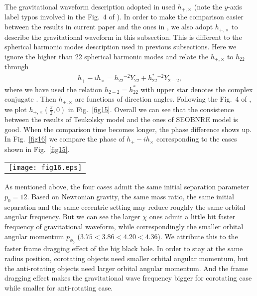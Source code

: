 \documentclass[prd,aps,a4paper,superscriptaddress,twocolumn,footinbib,showpacs]{revtex4}
\begin{document}
The gravitational waveform description adopted in \cite{han2014gravitational} used $h_{+,\times}$ (note the $y$-axis label typos involved in the Fig.~4 of \cite{han2014gravitational}). In order to make the comparison easier between the results in current paper and the ones in \cite{han2014gravitational}, we also adopt $h_{+,\times}$ to describe the gravitational waveform in this subsection. This is different to the spherical harmonic modes description used in previous subsections. Here we ignore the higher than 22 spherical harmonic modes and relate the $h_{+,\times}$ to $h_{22}$ through
\begin{align}
h_{+}-ih_{\times}=h_{22}{}^{-2}Y_{22}+h^{*}_{22}{}^{-2}Y_{2-2},
\end{align}
where we have used the relation $h_{2-2}=h^{*}_{22}$ with upper star denotes the complex conjugate \cite{PhysRevD.84.124052}. Then $h_{+,\times}$ are functions of direction angles. Following the Fig.~4 of \cite{han2014gravitational}, we plot $h_{+,\times}(\frac{\pi}{2},0)$ in Fig.~\ref{fig15}. Overall we can see that the consistence between the results of Teukolsky model and the ones of SEOBNRE model is good. When the comparison time becomes longer, the phase difference shows up. In Fig.~\ref{fig16} we compare the phase of $h_{+}-ih_{\times}$ corresponding to the cases shown in Fig.~\ref{fig15}.
\begin{figure*}
\begin{tabular}{c}
\texttt{[image: fig16.eps]}
\end{tabular}
\caption{Phase comparison of $h_{+}-ih_{\times}$ between Teukolsky equation based model and SEOBNRE model. Cases correspond to those of Fig.~\ref{fig15} respectively.}\label{fig16}
\end{figure*}

As mentioned above, the four cases admit the same initial separation parameter $p_0=12$. Based on Newtonian gravity, the same mass ratio, the same initial separation and the same eccentric setting may reduce roughly the same orbital angular frequency. But we can see the larger $\chi$ ones admit a little bit faster frequency of gravitational waveform, while correspondingly the smaller orbital angular momentum $p_{\phi_0}$ ($3.75<3.86<4.20<4.36$). We attribute this to the faster frame dragging effect of the big black hole. In order to stay at the same radius position, corotating objects need smaller orbital angular momentum, but the anti-rotating objects need larger orbital angular momentum. And the frame dragging effect makes the gravitational wave frequency bigger for corotating case while smaller for anti-rotating case.
\end{document}

